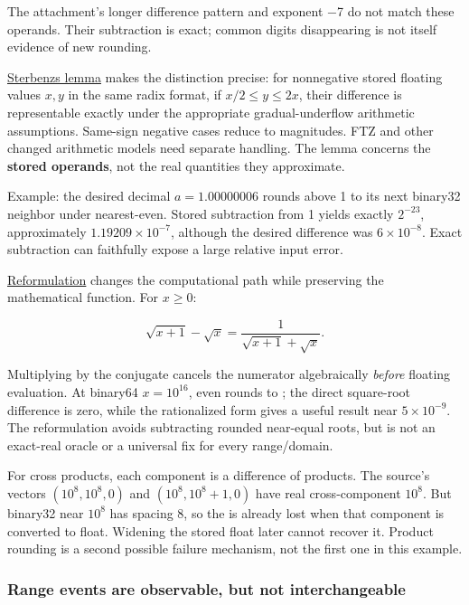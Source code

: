 The attachment's longer difference pattern and exponent −7 do not match these operands. Their subtraction is exact; common digits disappearing is not itself evidence of new rounding.

\hyperref[appendix-399b7ad53f39]{Sterbenz\textquotesingle s lemma} makes the distinction precise: for nonnegative stored floating values \(x,y\) in the same radix format, if \(x/2\le y\le2x\), their difference is representable exactly under the appropriate gradual-underflow arithmetic assumptions. Same-sign negative cases reduce to magnitudes. FTZ and other changed arithmetic models need separate handling. The lemma concerns the \textbf{stored operands}, not the real quantities they approximate.

Example: the desired decimal \(a=1.00000006\) rounds above 1 to its next binary32 neighbor under nearest-even. Stored subtraction from 1 yields exactly \(2^{-23}\), approximately \(1.19209\times10^{-7}\), although the desired difference was \(6\times10^{-8}\). Exact subtraction can faithfully expose a large relative input error.

\hyperref[appendix-d7f8ba961670]{Reformulation} changes the computational path while preserving the mathematical function. For \(x\ge0\):

\[
\sqrt{x+1}-\sqrt{x}
=\frac{1}{\sqrt{x+1}+\sqrt{x}}.
\]

Multiplying by the conjugate cancels the numerator algebraically \emph{before} floating evaluation. At binary64 \(x=10^{16}\), even  rounds to ; the direct square-root difference is zero, while the rationalized form gives a useful result near \(5\times10^{-9}\). The reformulation avoids subtracting rounded near-equal roots, but is not an exact-real oracle or a universal fix for every range/domain.

For cross products, each component is a difference of products. The source's vectors \((10^8,10^8,0)\) and \((10^8,10^8+1,0)\) have real cross-component \(10^8\). But binary32 near \(10^8\) has spacing 8, so the  is already lost when that component is converted to float. Widening the stored float later cannot recover it. Product rounding is a second possible failure mechanism, not the first one in this example.

\subsubsection{Range events are observable, but not interchangeable}\label{01-foundations-i-ch001-range-events-are-observable-but-not-interchangeable}

